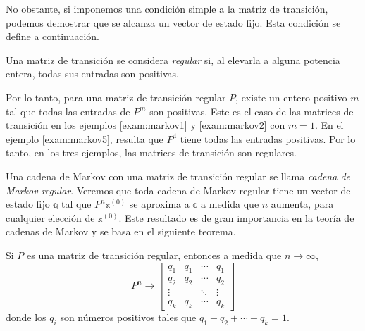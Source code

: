 No obstante, si imponemos una condición simple a la matriz de transición, podemos demostrar que se alcanza un vector de estado fijo. Esta condición se define a continuación.

\begin{definition}
    Una matriz de transición se considera \emph{regular} si, al elevarla a alguna potencia entera, todas sus entradas son positivas.
\end{definition}

Por lo tanto, para una matriz de transición regular $P$, existe un entero positivo $m$ tal que todas las entradas de $P^m$ son positivas. Este es el caso de las matrices de transición en los ejemplos \ref{exam:markov1} y \ref{exam:markov2} con $m = 1$. En el ejemplo \ref{exam:markov5}, resulta que $P^4$ tiene todas las entradas positivas. Por lo tanto, en los tres ejemplos, las matrices de transición son regulares.

Una cadena de Markov con una matriz de transición regular se llama \emph{cadena de Markov regular}. Veremos que toda cadena de Markov regular tiene un vector de estado fijo $\mathbb{q}$ tal que $P^n \mathbb{x}^{(0)}$ se aproxima a $\mathbb{q}$ a medida que $n$ aumenta, para cualquier elección de $\mathbb{x}^{(0)}$. Este resultado es de gran importancia en la teoría de cadenas de Markov y se basa en el siguiente teorema.

\newpage
{}

\begin{theorem}\label{theo:tomarkov2}
    Si $P$ es una matriz de transición regular, entonces a medida que $n \to \infty$,
    $$P^n \to \begin{bmatrix}
        q_1 & q_1 & \cdots & q_1 \\
        q_2 & q_2 & \cdots & q_2 \\
        \vdots & & \ddots & \vdots \\
        q_k & q_k & \cdots & q_k
    \end{bmatrix}$$
    donde los $q_i$ son números positivos tales que $q_1 + q_2 + \cdots + q_k = 1$.
\end{theorem}

